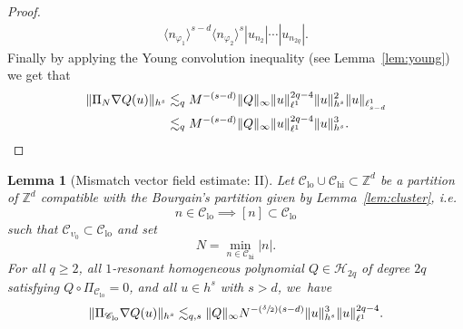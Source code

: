 \documentclass[10pt,a4paper]{amsart}
\providecommand{\ie}{i.e.}
\newcommand{\Psfrac}[2]{(\sfrac{#1}{#2})}
\theoremstyle{plain}
\newtheorem{lemma}[theorem]{Lemma}
\theoremstyle{definition}
\DeclareMathOperator{\hi}{hi}
\DeclareMathOperator{\lo}{lo}
\newcommand{\1}{\mathbf{1}}
\newcommand{\Clo}{\mathscr{C}_{\lo}}
\newcommand{\Chigh}{\mathscr{C}_{\hi}}
\begin{document}
\begin{proof}
\begin{equation*}
\begin{split}
\langle n_{\varphi_1}\rangle^{s-d} \langle n_{\varphi_2}\rangle^{s}
|u_{n_{2}}|\cdots|u_{n_{2q}}|.
\end{split}
\end{equation*}
Finally by applying the Young convolution inequality (see Lemma~\ref{lem:young}) we get that
\begin{align*}
\|\Pi_N\nabla Q(u) \|_{h^s} &\lesssim_q M^{-(s-d)} \|Q\|_{\infty} \| u\|_{\ell^1}^{2q-4} \| u \|_{h^s}^2 \| u\|_{\ell^1_{s-d}} \\ &\lesssim_q M^{-(s-d)} \|Q\|_{\infty} \| u\|_{\ell^1}^{2q-4} \| u \|_{h^s}^3.\qedhere
\end{align*}
\end{proof}

\begin{lemma}[Mismatch vector field estimate: II]
\label{lem:misII}
Let
$\Clo\cup \Chigh \subset \mathbb{Z}^d$ be a partition of $\mathbb{Z}^d$ compatible with the Bourgain's partition given by Lemma~\ref{lem:cluster}, \ie
\[
n\in \Clo \implies [n] \subset \Clo
\]
such that $\mathscr{C}_{\upsilon_0} \subset \Clo$ and set\vspace*{-3pt}
\[
N = \min_{n \in \Chigh} |n|.
\]
For all $q\geq 2$, all $1$-resonant homogeneous polynomial $Q\in\mathcal{H}_{2q}$ of degree $2q$ satisfying $Q\circ \Pi_{\Clo}=0$, and all $u\in h^{s}$ with $s>d$, we~have\vspace*{-3pt}
\begin{equation*}
\label{eq:misII}
\|\Pi_{\Clo} \nabla Q(u)\|_{h^{s}} \lesssim_{q,s} \| Q\|_{\infty} N^{-\Psfrac{\delta}{2}(s-d)}\|u\|_{h^{s}}^{3}\|u\|_{\ell^{1}}^{2q-4}.
\end{equation*}
\end{lemma}
\end{document}
